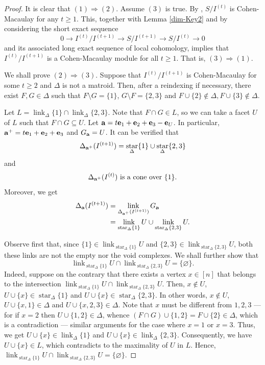 \documentclass[12pt]{amsart}
\numberwithin{equation}{section}
\theoremstyle{definition}
\theoremstyle{definition}
\DeclareMathOperator{\link}{link}
\DeclareMathOperator{\starop}{star}
\def\a{{\bold a}}
\def\e{{\bold e}}
\begin{document}
\begin{proof} It is clear that $(1)\Longrightarrow (2)$. Assume $(3)$ is true. By \cite{MT2011, V2011}, $S/I^{(t)}$ is Cohen-Macaulay for any $t\ge 1$. This, together with Lemma \ref{dim-Key2} and by considering the short exact sequence
	$$0\to  I^{(t)}/I^{(t+1)} \to S/I^{(t+1)}\to S/I^{(t)}\to 0$$
and its associated long exact sequence of local cohomology, implies that $I^{(t)}/I^{(t+1)}$ is a Cohen-Macaulay module for all $t\ge 1$. That is, $(3) \Longrightarrow (1)$. 
	
	We shall prove $(2)\Longrightarrow (3)$. Suppose that $I^{(t)}/I^{(t+1)}$ is Cohen-Macaulay for some $t\ge 2$ and $\Delta$ is not a matroid. Then, after a reindexing if necessary, there exist $F, G\in \Delta$ such that $F\setminus G=\{1\}$, $G\setminus F=\{2,3\}$ and $F\cup\{2\}\notin\Delta, F\cup\{3\}\notin\Delta$.
	
	Let $L = \link_{\Delta} \{1\} \cap \link_{\Delta} \{2,3\}$.
	Note that $F \cap G \in L$, so we can take 
	a facet $U$ of $L$ such that $F \cap G \subseteq U$.
	Let $\a = t\e_1+\e_2 + \e_3 -\e_{U}$.
	In particular, $\a^+ = t\e_1+\e_2 + \e_3$ and $G_{\a} = U$.
	It can be verified that
	$$\Delta_{\a^{+}}(I^{(t+1)}) = \starop_{\Delta} \{1\} \cup \starop_{\Delta}\{2,3\}$$
	and 
	$$\Delta_{\a^{+}}(I^{(t)}) \text{ is a cone over } \{1\}.$$
	Moreover, we get 
	\begin{align*}
		\Delta_{\a}(I^{(t+1)}) & = \link_{\Delta_{\a^+}(I^{(t+1)})} G_\a \\
		& =  \link_{\starop_{\Delta} \{1\}} U  \cup \link_{\starop_{\Delta} \{2,3\}}U. 
	\end{align*}

Observe first that, since $\{1\} \in \link_{\starop_{\Delta} \{1\}} U$ and 
	$\{2,3\} \in \link_{\starop_{\Delta} \{2,3\}} U$, both these links are not the empty nor the void complexes.
We shall further show that 
	$$\link_{\starop_{\Delta} \{1\}} U  \cap \link_{\starop_{\Delta} \{2,3\}}U 
	= \{ \varnothing \}.$$
	Indeed, suppose on the contrary that there exists a vertex $x \in [n]$ that
	belongs to the intersection $\link_{\starop_{\Delta} \{1\}} U  \cap \link_{\starop_{\Delta} \{2,3\}}U$.
	Then, 
	$x \not\in U$, $U \cup \{x\} \in \starop_{\Delta}\{1\}$ and
	$U \cup \{x\} \in \starop_{\Delta}\{2,3\}$.
	In other words,
	$x \not\in U$, $U \cup \{x,1\} \in \Delta$ and $U \cup \{x,2,3\} \in \Delta$.
	Note that $x$ must be different from $1,2,3$ --- for if $x=2$ then $U \cup \{1,2\} \in \Delta$, whence 
	$(F \cap G) \cup \{1,2\} = F\cup \{2\} \in \Delta$, which is a contradiction --- similar arguments for the case where $x =1$ or $x=3$.
	Thus, we get $U \cup \{x\} \in \link_{\Delta} \{1\}$ and
	$U \cup \{x\} \in \link_{\Delta} \{2,3\}$. Consequently, we have
	$U \cup \{x\} \in L$, which contradicts to the maximality of $U$ in $L$.
	Hence, $\link_{\starop_{\Delta} \{1\}} U \cap \link_{\starop_{\Delta} \{2,3\}}U 
	= \{ \varnothing \}$. 
	

\end{proof}
\end{document}
